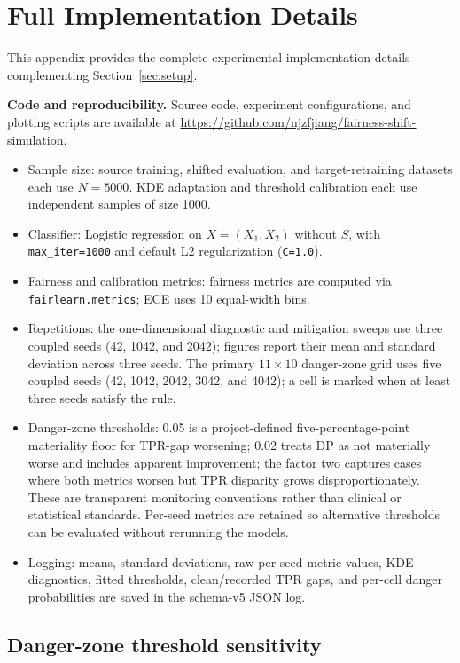 \documentclass[11pt, letterpaper]{article}
\begin{document}
\section{Full Implementation Details}
\label{app:d}

This appendix provides the complete experimental implementation details complementing Section~\ref{sec:setup}.

\textbf{Code and reproducibility.} Source code, experiment configurations, and plotting scripts are available at \url{https://github.com/njzfjiang/fairness-shift-simulation}.

\begin{itemize}
    \item Sample size: source training, shifted evaluation, and target-retraining datasets each use \(N=5000\). KDE adaptation and threshold calibration each use independent samples of size 1000.
    \item Classifier: Logistic regression on $X=(X_1,X_2)$ without $S$, with \texttt{max\_iter=1000} and default L2 regularization (\texttt{C=1.0}).
    \item Fairness and calibration metrics: fairness metrics are computed via \texttt{fairlearn.metrics}; ECE uses 10 equal-width bins.
    \item Repetitions: the one-dimensional diagnostic and mitigation sweeps use three coupled seeds (42, 1042, and 2042); figures report their mean and standard deviation across three seeds. The primary $11\times10$ danger-zone grid uses five coupled seeds (42, 1042, 2042, 3042, and 4042); a cell is marked when at least three seeds satisfy the rule.
    \item Danger-zone thresholds: 0.05 is a project-defined five-percentage-point materiality floor for TPR-gap worsening; 0.02 treats DP as not materially worse and includes apparent improvement; the factor two captures cases where both metrics worsen but TPR disparity grows disproportionately. These are transparent monitoring conventions rather than clinical or statistical standards. Per-seed metrics are retained so alternative thresholds can be evaluated without rerunning the models.
    \item Logging: means, standard deviations, raw per-seed metric values, KDE diagnostics, fitted thresholds, clean/recorded TPR gaps, and per-cell danger probabilities are saved in the schema-v5 JSON log.
\end{itemize}

\subsection{Danger-zone threshold sensitivity}
\end{document}

